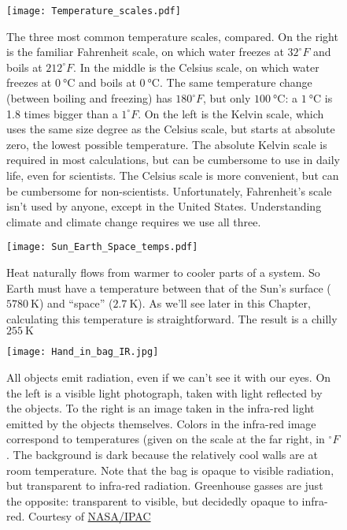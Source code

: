 \documentclass[amstex,12pt]{book}
\begin{document}
\begin{figure}[p]
\centering
\texttt{[image: Temperature\_scales.pdf]}%
\caption{The three most common temperature scales, compared. On the right is the familiar Fahrenheit scale, on which water freezes at $32 ^{\circ}F$ and boils at $212 ^{\circ}F$. In the middle is the Celsius scale, on which water freezes at $\SI{0}{\degreeCelsius}$ and boils at $\SI{0}{\degreeCelsius}$. The same temperature change (between boiling and freezing) has $180 ^{\circ}F$, but only $\SI{100}{\degreeCelsius}$: a $\SI{1}{\degreeCelsius}$ is 1.8 times bigger than a $1 ^{\circ}F$. On the left is the Kelvin scale, which uses the same size degree as the Celsius scale, but starts at absolute zero, the lowest possible temperature. The absolute Kelvin scale is required in most calculations, but can be cumbersome to use in daily life, even for scientists. The Celsius scale is more convenient, but can be cumbersome for non-scientists. Unfortunately, Fahrenheit's scale isn't used by anyone, except in the United States. Understanding climate and climate change requires we use all three. }
\label{fig:temp_scales}
\end{figure}

\begin{figure}[p]
\centering
\texttt{[image: Sun\_Earth\_Space\_temps.pdf]}%
\caption{Heat naturally flows from warmer to cooler parts of a system. So Earth must have a temperature between that of the Sun's surface ($\SI{5780}{\kelvin}$) and ``space'' ($\SI{2.7}{\kelvin}$). As we'll see later in this Chapter, calculating this temperature is straightforward. The result is a chilly $\SI{255}{\kelvin}$ }
\label{fig:sun_earth_sys_temps}
\end{figure}


\begin{figure}[p]
\centering
\texttt{[image: Hand\_in\_bag\_IR.jpg]}%
\caption{All objects emit radiation, even if we can't see it with our eyes. On the left is a visible light photograph, taken with light reflected by the objects. To the right is an image taken in the infra-red light emitted by the objects themselves. Colors in the infra-red image correspond to temperatures (given on the scale at the far right, in $^{\circ}F$. The background is dark because the relatively cool walls are at room temperature. Note that the bag is opaque to visible radiation, but transparent to infra-red radiation. Greenhouse gasses are just the opposite: transparent to visible, but decidedly opaque to infra-red. Courtesy of \href{http://coolcosmos.ipac.caltech.edu/cosmic_kids/learn_ir/}{NASA/IPAC}}
\label{fig:Hand_IR}
\end{figure}
\end{document}

